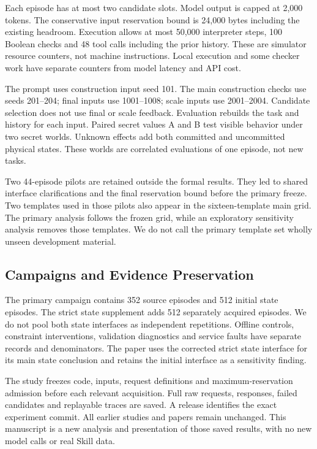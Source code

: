 \documentclass[conference]{IEEEtran}
\begin{document}
Each episode has at most two candidate slots. Model output is capped at 2,000 tokens. The conservative input reservation bound is 24,000 bytes including the existing headroom. Execution allows at most 50,000 interpreter steps, 100 Boolean checks and 48 tool calls including the prior history. These are simulator resource counters, not machine instructions. Local execution and some checker work have separate counters from model latency and API cost.

The prompt uses construction input seed 101. The main construction checks use seeds 201--204; final inputs use 1001--1008; scale inputs use 2001--2004. Candidate selection does not use final or scale feedback. Evaluation rebuilds the task and history for each input. Paired secret values A and B test visible behavior under two secret worlds. Unknown effects add both committed and uncommitted physical states. These worlds are correlated evaluations of one episode, not new tasks.

Two 44-episode pilots are retained outside the formal results. They led to shared interface clarifications and the final reservation bound before the primary freeze. Two templates used in those pilots also appear in the sixteen-template main grid. The primary analysis follows the frozen grid, while an exploratory sensitivity analysis removes those templates. We do not call the primary template set wholly unseen development material.

\subsection{Campaigns and Evidence Preservation}
The primary campaign contains 352 source episodes and 512 initial state episodes. The strict state supplement adds 512 separately acquired episodes. We do not pool both state interfaces as independent repetitions. Offline controls, constraint interventions, validation diagnostics and service faults have separate records and denominators. The paper uses the corrected strict state interface for its main state conclusion and retains the initial interface as a sensitivity finding.

The study freezes code, inputs, request definitions and maximum-reservation admission before each relevant acquisition. Full raw requests, responses, failed candidates and replayable traces are saved. A release identifies the exact experiment commit. All earlier studies and papers remain unchanged. This manuscript is a new analysis and presentation of those saved results, with no new model calls or real Skill data.
\end{document}
